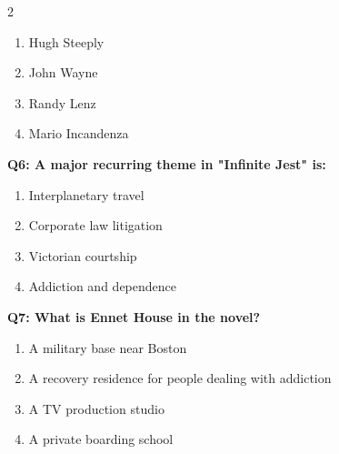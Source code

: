 \documentclass[10pt]{article}
\begin{document}
\begin{multicols}{2}
\begin{enumerate}[label=\arabic*.]
\item Hugh Steeply
\item John Wayne
\item Randy Lenz
\item Mario Incandenza
\end{enumerate}
\textbf{Q6: A major recurring theme in "Infinite Jest" is:}

\begin{enumerate}[label=\arabic*.]
\item Interplanetary travel
\item Corporate law litigation
\item Victorian courtship
\item Addiction and dependence
\end{enumerate}
\textbf{Q7: What is Ennet House in the novel?}

\begin{enumerate}[label=\arabic*.]
\item A military base near Boston
\item A recovery residence for people dealing with addiction
\item A TV production studio
\item A private boarding school
\end{enumerate}
\end{multicols}

\newpage
\end{document}
